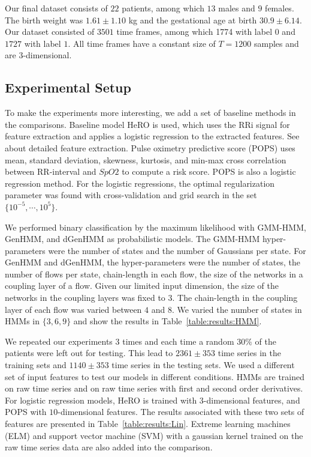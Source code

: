 Our final dataset consists of $22$ patients, among which $13$ males and $9$ females.
The birth weight was $1.61\pm1.10$ kg and the gestational age at birth $30.9\pm6.14$.
Our dataset consisted of $3501$ time frames, among which 1774 with label $0$ and $1727$ with label $1$.
All time frames have a constant size of $T=1200$ samples and are $3$-dimensional.

\subsection{Experimental Setup}
To make the experiments more interesting, we add a set of baseline methods in the comparisons.
Baseline model HeRO is used, which uses the RRi signal for feature extraction and applies a logistic regression to the extracted features. See \cite{honore2020icassp} about detailed feature extraction.
Pulse oximetry predictive score (POPS) \cite{sullivanEarlyPulseOximetry2018} uses mean, standard deviation, skewness, kurtosis, and min-max cross correlation between RR-interval and $SpO2$ to compute a risk score. POPS is also a logistic regression method. 
For the logistic regressions, the optimal regularization parameter was found with cross-validation and grid search in the set $\{10^{-5}, \cdots, 10^{5}\}$.

We performed binary classification by the maximum likelihood with GMM-HMM, GenHMM, and dGenHMM as probabilistic models.
The GMM-HMM hyper-parameters were the number of states and the number of Gaussians per state.
For GenHMM and dGenHMM, the hyper-parameters were the number of states, the number of flows per state, chain-length in each flow, the size of the networks in a coupling layer of a flow.
Given our limited input dimension, the size of the networks in the coupling layers was fixed to $3$.
The chain-length in the coupling layer of each flow was varied between $4$ and $8$.
We varied the number of states in HMMs in $\{3,6,9\}$ and show the results in Table~\ref{table:results:HMM}.

We repeated our experiments $3$ times and each time a random $30\%$ of the patients were left out for testing.
This lead to $2361 \pm 353$ time series in the training sets and $1140 \pm 353$ time series in the testing sets.
We used a different set of input features to test our models in different conditions.
HMMs are trained on raw time series and on raw time series with first and second order derivatives.
For logistic regression models, HeRO is trained with $3$-dimensional features, and POPS with $10$-dimensional features.
The results associated with these two sets of features are presented in Table~\ref{table:results:Lin}.
Extreme learning machines (ELM) and support vector machine (SVM) with a gaussian kernel trained on the raw time series data are also added into the comparison.

